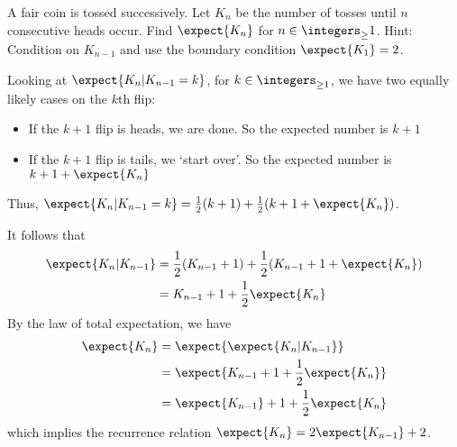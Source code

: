 \documentclass[hwnumber=5,studentnumber=20053722]{mthe353answer}
\begin{document}
  \begin{questions}
    \setcounter{question}{2}
    \question{}
    A fair coin is tossed successively. Let \(K_n\) be the number of tosses until
    \(n\) consecutive heads occur. Find \(\expect{K_n}\) for \(n \in \integers_{\ge} 1\).
    Hint: Condition on \(K_{n-1}\) and use the boundary condition \(\expect{K_1}=2\).
    \begin{solution}
      Looking at \(\expect{K_n|K_{n-1}=k}\), for \(k \in \integers_{\ge 1}\),
      we have two equally likely cases on the \(k\)th flip:
      \begin{itemize}
        \item If the \(k+1\) flip is heads, we are done. So the expected number
          is \(k + 1\)
        \item If the \(k+1\) flip is tails, we `start over'. So the expected
          number is \(k + 1 + \expect{K_n}\)
      \end{itemize}
      Thus, \(\expect{K_n|K_{n-1}=k} = \frac{1}{2}(k+1) + \frac{1}{2}(k+1+\expect{K_n})\).

      It follows that
      \begin{align*}
        \expect{K_n|K_{n-1}} &= \frac{1}{2}(K_{n-1}+1) +
          \frac{1}{2}(K_{n-1}+1+\expect{K_n})\\
        &= K_{n-1} + 1 + \frac{1}{2}\expect{K_n}
      \end{align*}
      By the law of total expectation, we have
      \begin{align*}
        \expect{K_n} &= \expect{\expect{K_n|K_{n-1}}}\\
        &= \expect{K_{n-1} + 1 + \frac{1}{2}\expect{K_n}}\\
        &= \expect{K_{n-1}} + 1 + \frac{1}{2}\expect{K_n}
      \end{align*}
      which implies the recurrence relation \(\expect{K_n} = 2\expect{K_{n-1}} + 2\).


\end{solution}
\end{questions}
\end{document}
